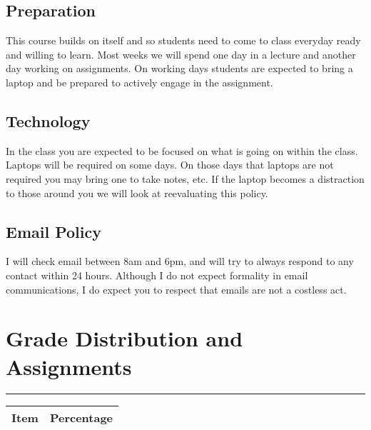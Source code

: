 \documentclass[11pt]{article}
\begin{document}
\subsection*{Preparation} This course builds on itself and so students need to come to class everyday ready and willing to learn. Most weeks we will spend one day in a lecture and another day working on assignments. On working days students are expected to bring a laptop and be prepared to actively engage in the assignment. \\


\subsection*{Technology} In the class you are expected to be focused on what is going on within the class. Laptops will be required on some days. On those days that laptops are not required you may bring one to take notes, etc. If the laptop becomes a distraction to those around you we will look at reevaluating this policy.  \\

\subsection*{Email Policy} I will check email between 8am and 6pm, and will try to always respond to any contact within 24 hours. Although I do not expect formality in email communications, I do expect you to respect that emails are not a costless act. \\ 


\section*{\Large Grade Distribution and Assignments} \hrule 
\vspace{.2cm}
\begin{table}[h!]
	\centering
\begin{tabular}{l c}
	Item & Percentage \\ \hline 
\end{tabular}
\end{table}
\end{document}
